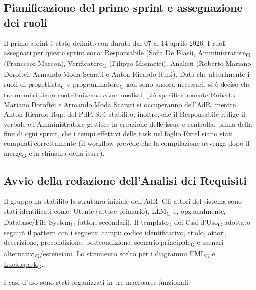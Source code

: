 \subsection{Pianificazione del primo sprint e assegnazione dei ruoli}
Il primo sprint è stato definito con durata dal 07 al 14 aprile 2026. I ruoli assegnati per questo sprint sono: Responsabile (Sofia De Blasi), Amministratore\textsubscript{G} (Francesco Marcon), Verificatore\textsubscript{G} (Filippo Idiometri), Analisti (Roberto Mariano Doroftei, Armando Moda Scarati e Anton Ricardo Rupi). 
Dato che attualmente i ruoli di progettista\textsubscript{G} e programmatore\textsubscript{G} non sono ancora necessari, si è deciso che tre membri siano contribuiscano come analisti, più specificatamente Roberto Mariano Doroftei e Armando Moda Scarati si occuperanno dell'AdR, mentre Anton Ricardo Rupi del PdP. 
Si è stabilito, inoltre, che il Responsabile redige il verbale e l'Amministratore gestisce la creazione delle issue e controlla, prima della fine di ogni sprint, che i tempi effettivi delle task nel foglio Excel siano stati compilati correttamente (il workflow prevede che la compilazione avvenga dopo il merge\textsubscript{G} e la chiusura della issue).
 
\subsection{Avvio della redazione dell'Analisi dei Requisiti}
Il gruppo ha stabilito la struttura iniziale dell'AdR. Gli attori del sistema sono stati identificati come: Utente (attore primario), LLM\textsubscript{G} e, opzionalmente, Database/File System\textsubscript{G} (attori secondari). Il template\textsubscript{G} dei Casi d'Uso\textsubscript{G} adottato seguirà il pattern con i seguenti campi: codice identificativo, titolo, attori, descrizione, precondizione, postcondizione, scenario principale\textsubscript{G} e scenari alternativi\textsubscript{G}/estensioni. Lo strumento scelto per i diagrammi UML\textsubscript{G} è \href{https://lucid.co/lucidspark}{\underline{Lucidspark}\textsubscript{G}}. 

I casi d'uso sono stati organizzati in tre macroaree funzionali:
 
